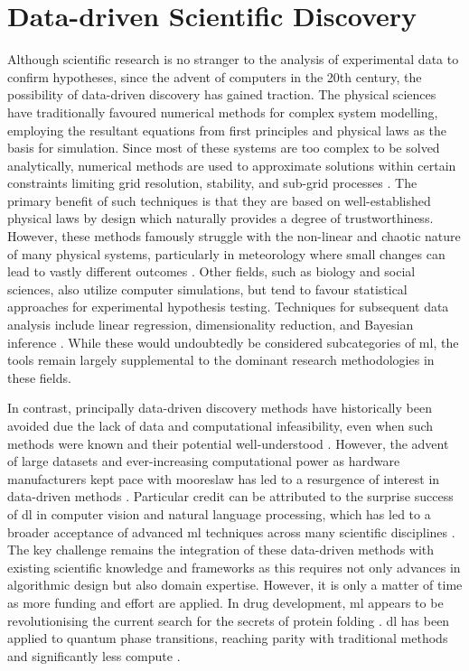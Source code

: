 \section{Data-driven Scientific Discovery}

Although scientific research is no stranger to the analysis of experimental data to confirm hypotheses, since the advent of computers in the 20th century, the possibility of data-driven discovery has gained traction. The physical sciences have traditionally favoured numerical methods for complex system modelling, employing the resultant equations from first principles and physical laws as the basis for simulation. Since most of these systems are too complex to be solved analytically, numerical methods are used to approximate solutions within certain constraints limiting grid resolution, stability, and sub-grid processes \citep{Lynch2008}. The primary benefit of such techniques is that they are based on well-established physical laws by design which naturally provides a degree of trustworthiness. However, these methods famously struggle with the non-linear and chaotic nature of many physical systems, particularly in meteorology where small changes can lead to vastly different outcomes \citep{Lorenz1963}. Other fields, such as biology and social sciences, also utilize computer simulations, but tend to favour statistical approaches for experimental hypothesis testing. Techniques for subsequent data analysis include linear regression, dimensionality reduction, and Bayesian inference \citep{Ackermann2011,Weinstein2010}. While these would undoubtedly be considered subcategories of \acrshort{ml}, the tools remain largely supplemental to the dominant research methodologies in these fields.

In contrast, principally data-driven discovery methods have historically been avoided due the lack of data and computational infeasibility, even when such methods were known and their potential well-understood \citep{Rosenblatt1957,Rumelhart1986}. However, the advent of large datasets and ever-increasing computational power as hardware manufacturers kept pace with \Gls{mooreslaw} has led to a resurgence of interest in data-driven methods \citep{Haber2025}. Particular credit can be attributed to the surprise success of \acrfull{dl} in computer vision and natural language processing, which has led to a broader acceptance of advanced \acrfull{ml} techniques across many scientific disciplines \citep{Haber2025,Krizhevsky2017}. The key challenge remains the integration of these data-driven methods with existing scientific knowledge and frameworks as this requires not only advances in algorithmic design but also domain expertise. However, it is only a matter of time as more funding and effort are applied. In drug development, \acrfull{ml} appears to be revolutionising the current search for the secrets of protein folding \citep{Jumper2021}. \acrshort{dl} has been applied to quantum phase transitions, reaching parity with traditional methods and significantly less compute \citep{Huembeli2018}.

